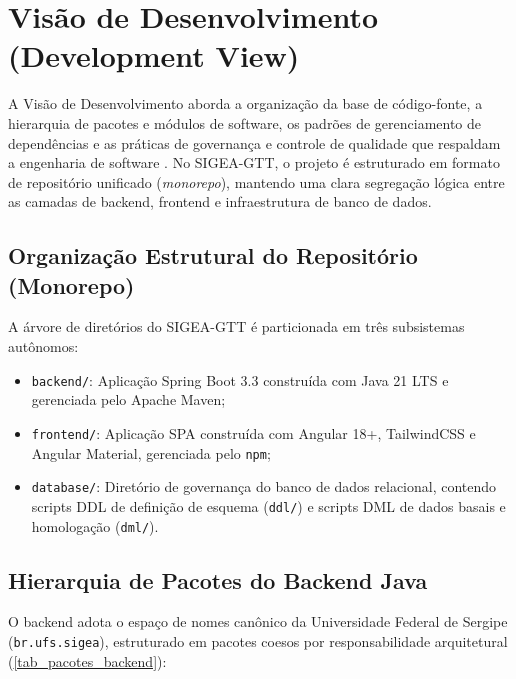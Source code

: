 \chapter{Visão de Desenvolvimento (Development View)}
\label{cap_visao_desenvolvimento}

A Visão de Desenvolvimento aborda a organização da base de código-fonte, a hierarquia de pacotes e módulos de software, os padrões de gerenciamento de dependências e as práticas de governança e controle de qualidade que respaldam a engenharia de software \cite{kruchten1995,sommerville2019}. No SIGEA-GTT, o projeto é estruturado em formato de repositório unificado (\textit{monorepo}), mantendo uma clara segregação lógica entre as camadas de backend, frontend e infraestrutura de banco de dados.

\section{Organização Estrutural do Repositório (Monorepo)}
\label{sec_organizacao_monorepo}

A árvore de diretórios do SIGEA-GTT é particionada em três subsistemas autônomos:

\begin{itemize}
    \item \texttt{backend/}: Aplicação Spring Boot 3.3 construída com Java 21 LTS e gerenciada pelo Apache Maven;
    \item \texttt{frontend/}: Aplicação SPA construída com Angular 18+, TailwindCSS e Angular Material, gerenciada pelo \texttt{npm};
    \item \texttt{database/}: Diretório de governança do banco de dados relacional, contendo scripts DDL de definição de esquema (\texttt{ddl/}) e scripts DML de dados basais e homologação (\texttt{dml/}).
\end{itemize}

\section{Hierarquia de Pacotes do Backend Java}
\label{sec_pacotes_backend}

O backend adota o espaço de nomes canônico da Universidade Federal de Sergipe (\texttt{br.ufs.sigea}), estruturado em pacotes coesos por responsabilidade arquitetural (\autoref{tab_pacotes_backend}):


